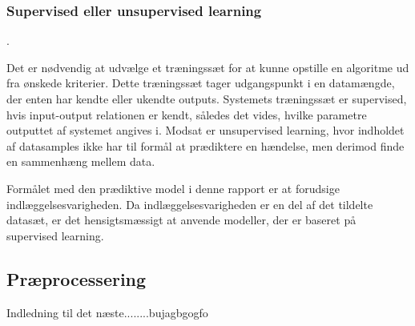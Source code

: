 
\subsubsection{Supervised eller unsupervised learning}
\cite{DIKU2010}. %

Det er nødvendig at udvælge et træningssæt for at kunne opstille en algoritme ud fra ønskede kriterier. Dette træningssæt tager udgangspunkt i en datamængde, der enten har kendte eller ukendte outputs.
Systemets træningssæt er supervised, hvis input-output relationen er kendt, således det vides, hvilke parametre outputtet af systemet angives i. \cite{Brownlee2013} Modsat er unsupervised learning, hvor indholdet af datasamples ikke har til formål at prædiktere en hændelse, men derimod finde en sammenhæng mellem data.\cite{Brownlee2013, Kuhn2013} 

Formålet med den prædiktive model i denne rapport er at forudsige indlæggelsesvarigheden. Da indlæggelsesvarigheden er en del af det tildelte datasæt, er det hensigtsmæssigt at anvende modeller, der er baseret på supervised learning. 

\subsection{Præprocessering}
Indledning til det næste........bujagbgogfo

